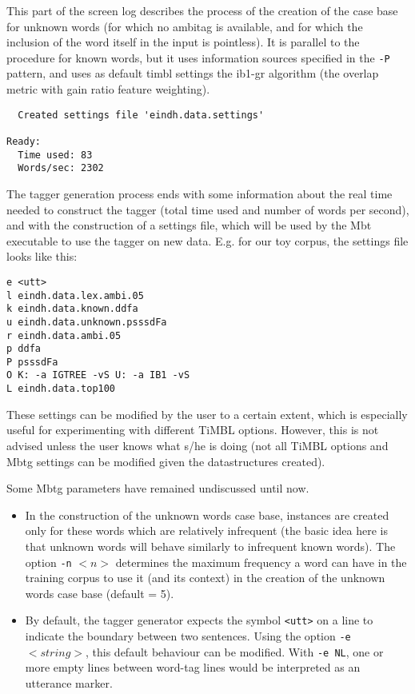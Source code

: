 \documentclass{report}
\begin{document}
This part of the screen log describes the process of the creation of
the case base for unknown words (for which no ambitag is available,
and for which the inclusion of the word itself in the input is
pointless). It is parallel to the procedure for known words, but it
uses information sources specified in the {\tt -P} pattern, and uses
as default {\sc timbl} settings the {\sc ib1-gr} algorithm (the
overlap metric with gain ratio feature weighting).

{\small
\begin{verbatim}
  Created settings file 'eindh.data.settings'

Ready:
  Time used: 83
  Words/sec: 2302
\end{verbatim}
}

The tagger generation process ends with some information about the
real time needed to construct the tagger (total time used and number
of words per second), and with the construction of a settings file,
which will be used by the Mbt executable to use the tagger on
new data. E.g. for our toy corpus, the settings file looks like this:

{\small
\begin{verbatim}
e <utt>
l eindh.data.lex.ambi.05
k eindh.data.known.ddfa
u eindh.data.unknown.psssdFa
r eindh.data.ambi.05
p ddfa
P psssdFa
O K: -a IGTREE -vS U: -a IB1 -vS
L eindh.data.top100
\end{verbatim}
}

These settings can be modified by the user to a certain extent, which
is especially useful for experimenting with different TiMBL
options. However, this is not advised unless the user knows what s/he
is doing (not all TiMBL options and Mbtg settings can be
modified given the datastructures created).

Some Mbtg parameters have remained undiscussed until now. 

\begin{itemize}
\item 
In the construction of the unknown words case base, instances are
created only for these words which are relatively infrequent (the
basic idea here is that unknown words will behave similarly to
infrequent known words).  The option {\tt -n} $<n>$ determines the maximum
frequency a word can have in the training corpus to use it (and its
context) in the creation of the unknown words case base (default = 5).
\item
By default, the tagger generator expects the symbol {\tt <utt>} on a line
to indicate the boundary between two sentences.
Using the option {\tt -e} $<string>$, this default behaviour can be
modified. With {\tt -e NL}, one or more empty lines between word-tag lines
would be interpreted as an utterance marker.
\end{itemize}
\end{document}
